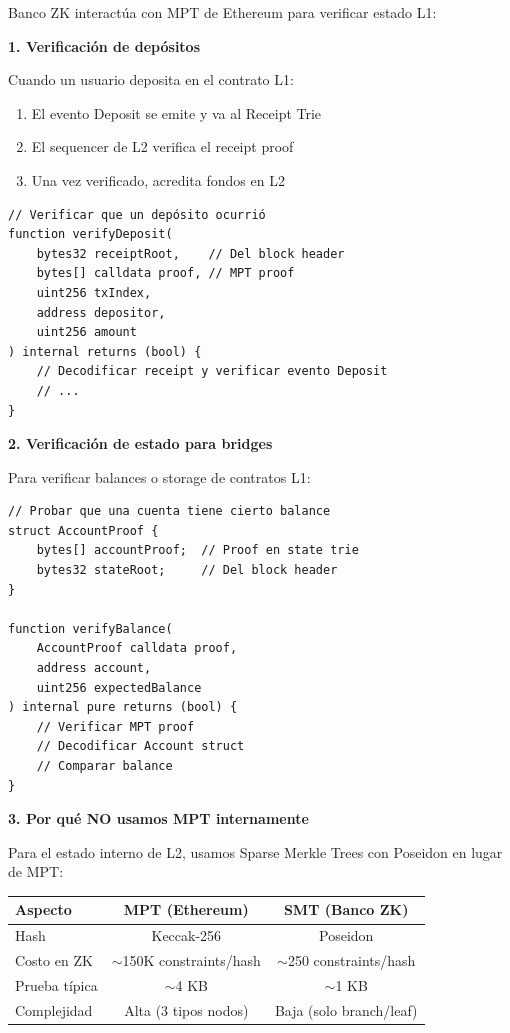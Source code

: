 \documentclass[11pt,a4paper,twoside,openright]{book}
\theoremstyle{definition}
\theoremstyle{plain}
\theoremstyle{remark}
\begin{document}
\begin{bancozk}
Banco ZK interactúa con MPT de Ethereum para verificar estado L1:

\textbf{1. Verificación de depósitos}

Cuando un usuario deposita en el contrato L1:
\begin{enumerate}
    \item El evento Deposit se emite y va al Receipt Trie
    \item El sequencer de L2 verifica el receipt proof
    \item Una vez verificado, acredita fondos en L2
\end{enumerate}

\begin{verbatim}
// Verificar que un depósito ocurrió
function verifyDeposit(
    bytes32 receiptRoot,    // Del block header
    bytes[] calldata proof, // MPT proof
    uint256 txIndex,
    address depositor,
    uint256 amount
) internal returns (bool) {
    // Decodificar receipt y verificar evento Deposit
    // ...
}
\end{verbatim}

\textbf{2. Verificación de estado para bridges}

Para verificar balances o storage de contratos L1:
\begin{verbatim}
// Probar que una cuenta tiene cierto balance
struct AccountProof {
    bytes[] accountProof;  // Proof en state trie
    bytes32 stateRoot;     // Del block header
}

function verifyBalance(
    AccountProof calldata proof,
    address account,
    uint256 expectedBalance
) internal pure returns (bool) {
    // Verificar MPT proof
    // Decodificar Account struct
    // Comparar balance
}
\end{verbatim}

\textbf{3. Por qué NO usamos MPT internamente}

Para el estado interno de L2, usamos Sparse Merkle Trees con Poseidon en lugar de MPT:

\begin{center}
\begin{tabular}{lcc}
\toprule
\textbf{Aspecto} & \textbf{MPT (Ethereum)} & \textbf{SMT (Banco ZK)} \\
\midrule
Hash & Keccak-256 & Poseidon \\
Costo en ZK & $\sim$150K constraints/hash & $\sim$250 constraints/hash \\
Prueba típica & $\sim$4 KB & $\sim$1 KB \\
Complejidad & Alta (3 tipos nodos) & Baja (solo branch/leaf) \\
\bottomrule
\end{tabular}
\end{center}


\end{bancozk}
\end{document}
